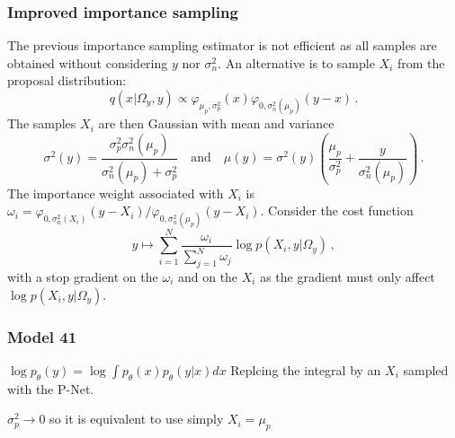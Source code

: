 \documentclass[review]{cvpr}
\begin{document}
\subsubsection{Improved importance sampling}
The previous importance sampling estimator is not efficient as all samples are obtained without considering $y$ nor $\sigma_n^2$. An alternative is to sample $X_i$ from the proposal distribution:
$$
q(x|\Omega_y,y)\propto \varphi_{\mu_p,\sigma_p^2}(x)   \varphi_{0,\sigma_n^2(\mu_p)}(y-x)\,.
$$
The samples $X_i$ are then Gaussian with mean and variance
$$
\sigma^2(y) = \frac{\sigma_p^2\sigma_n^2(\mu_p)}{\sigma_n^2(\mu_p)+\sigma_p^2} \quad\mbox{and}\quad \mu(y) = \sigma^2(y)\left(\frac{\mu_p}{\sigma_p^2} + \frac{y}{\sigma_n^2(\mu_p)}\right)\,.$$
The importance weight associated with $X_i$ is $\omega_i = \varphi_{0,\sigma_n^2(X_i)}(y-X_i)/\varphi_{0,\sigma_n^2(\mu_p)}(y-X_i)$. Consider the cost function
$$
y \mapsto \sum_{i=1}^N\frac{\omega_i}{\sum_{j=1}^N\omega_j}  \log p(X_i,y|\Omega_y)\,,
$$
with a stop gradient on the $\omega_i$ and on the $X_i$ as the gradient must only affect $ \log p(X_i,y|\Omega_y)$.

\subsubsection{Model 41}

$\log p_\theta(y) = \log\int p_\theta(x)p_\theta(y|x)dx$
Replcing the integral by an $X_i$ sampled with the P-Net.

$\sigma_p^2 \to 0$ so it is equivalent to use simply $X_i = \mu_p$
\end{document}
